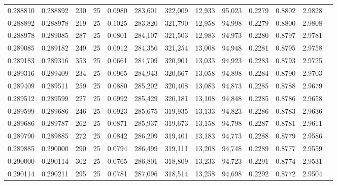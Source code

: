 \begin{tabular}{rrrrrrrrrrrrr}
0.288810 & 0.288892 &   230 &  25 &                                     0.0980 & 283,601 & 322,009 &  12,933 &  95,023 & 0.2279 & 0.8802 & 2.9828 \\
0.288892 & 0.288978 &   219 &  25 &                                     0.1025 & 283,820 & 321,790 &  12,958 &  94,998 & 0.2279 & 0.8800 & 2.9808 \\
0.288978 & 0.289085 &   287 &  25 &                                     0.0801 & 284,107 & 321,503 &  12,983 &  94,973 & 0.2280 & 0.8797 & 2.9781 \\
0.289085 & 0.289182 &   249 &  25 &                                     0.0912 & 284,356 & 321,254 &  13,008 &  94,948 & 0.2281 & 0.8795 & 2.9758 \\
0.289183 & 0.289316 &   353 &  25 &                                     0.0661 & 284,709 & 320,901 &  13,033 &  94,923 & 0.2283 & 0.8793 & 2.9725 \\
0.289316 & 0.289409 &   234 &  25 &                                     0.0965 & 284,943 & 320,667 &  13,058 &  94,898 & 0.2284 & 0.8790 & 2.9703 \\
0.289409 & 0.289511 &   259 &  25 &                                     0.0880 & 285,202 & 320,408 &  13,083 &  94,873 & 0.2285 & 0.8788 & 2.9679 \\
0.289512 & 0.289599 &   227 &  25 &                                     0.0992 & 285,429 & 320,181 &  13,108 &  94,848 & 0.2285 & 0.8786 & 2.9658 \\
0.289599 & 0.289686 &   246 &  25 &                                     0.0923 & 285,675 & 319,935 &  13,133 &  94,823 & 0.2286 & 0.8783 & 2.9636 \\
0.289686 & 0.289787 &   262 &  25 &                                     0.0871 & 285,937 & 319,673 &  13,158 &  94,798 & 0.2287 & 0.8781 & 2.9611 \\
0.289790 & 0.289885 &   272 &  25 &                                     0.0842 & 286,209 & 319,401 &  13,183 &  94,773 & 0.2288 & 0.8779 & 2.9586 \\
0.289885 & 0.290000 &   290 &  25 &                                     0.0794 & 286,499 & 319,111 &  13,208 &  94,748 & 0.2289 & 0.8777 & 2.9559 \\
0.290000 & 0.290114 &   302 &  25 &                                     0.0765 & 286,801 & 318,809 &  13,233 &  94,723 & 0.2291 & 0.8774 & 2.9531 \\
0.290114 & 0.290211 &   295 &  25 &                                     0.0781 & 287,096 & 318,514 &  13,258 &  94,698 & 0.2292 & 0.8772 & 2.9504 \\

\end{tabular}
